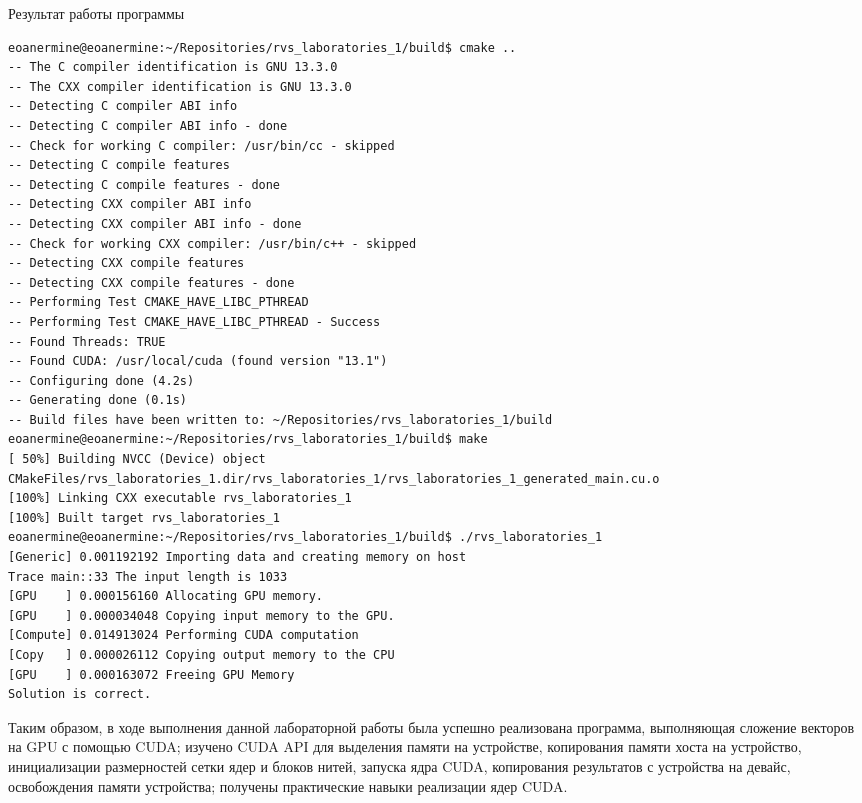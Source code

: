 \documentclass[14pt]{extarticle}
\makeatletter
\newenvironment{code}{\captionsetup{type=listing, belowskip=-14pt plus 3pt minus 0pt}}{}
\newcounter{sectionc} %
\newcommand{\nonumbersections}{\renewcommand{\Hy@numberline}[1]{}}
\let\oldsectionc\sectionc
\renewcommand{\sectionc}{\nonumbersections\oldsectionc}
\makeatother
\begin{document}
\begin{code}    
\caption{Результат работы программы\label{lst:output}}
\begin{verbatim}
eoanermine@eoanermine:~/Repositories/rvs_laboratories_1/build$ cmake ..
-- The C compiler identification is GNU 13.3.0
-- The CXX compiler identification is GNU 13.3.0
-- Detecting C compiler ABI info
-- Detecting C compiler ABI info - done
-- Check for working C compiler: /usr/bin/cc - skipped
-- Detecting C compile features
-- Detecting C compile features - done
-- Detecting CXX compiler ABI info
-- Detecting CXX compiler ABI info - done
-- Check for working CXX compiler: /usr/bin/c++ - skipped
-- Detecting CXX compile features
-- Detecting CXX compile features - done
-- Performing Test CMAKE_HAVE_LIBC_PTHREAD
-- Performing Test CMAKE_HAVE_LIBC_PTHREAD - Success
-- Found Threads: TRUE
-- Found CUDA: /usr/local/cuda (found version "13.1")
-- Configuring done (4.2s)
-- Generating done (0.1s)
-- Build files have been written to: ~/Repositories/rvs_laboratories_1/build
eoanermine@eoanermine:~/Repositories/rvs_laboratories_1/build$ make
[ 50%] Building NVCC (Device) object CMakeFiles/rvs_laboratories_1.dir/rvs_laboratories_1/rvs_laboratories_1_generated_main.cu.o
[100%] Linking CXX executable rvs_laboratories_1
[100%] Built target rvs_laboratories_1
eoanermine@eoanermine:~/Repositories/rvs_laboratories_1/build$ ./rvs_laboratories_1
[Generic] 0.001192192 Importing data and creating memory on host
Trace main::33 The input length is 1033
[GPU    ] 0.000156160 Allocating GPU memory.
[GPU    ] 0.000034048 Copying input memory to the GPU.
[Compute] 0.014913024 Performing CUDA computation
[Copy   ] 0.000026112 Copying output memory to the CPU
[GPU    ] 0.000163072 Freeing GPU Memory
Solution is correct.
\end{verbatim}
\end{code}


Таким образом, в ходе выполнения данной лабораторной работы была успешно реализована программа, выполняющая сложение векторов на GPU с помощью CUDA; изучено CUDA API для выделения памяти на устройстве, копирования памяти хоста на устройство, инициализации размерностей сетки ядер и блоков нитей, запуска ядра CUDA, копирования результатов с устройства на девайс, освобождения памяти устройства; получены практические навыки реализации ядер CUDA.
\end{document}
